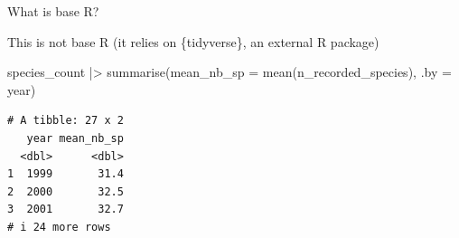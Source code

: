 \documentclass[
  ignorenonframetext,
  aspectratio=169,
]{beamer}
\newenvironment{Shaded}{\begin{snugshade}}{\end{snugshade}}
\newcommand{\AttributeTok}[1]{\textcolor[rgb]{0.40,0.45,0.13}{#1}}
\newcommand{\FunctionTok}[1]{\textcolor[rgb]{0.28,0.35,0.67}{#1}}
\newcommand{\NormalTok}[1]{\textcolor[rgb]{0.00,0.23,0.31}{#1}}
\newcommand{\SpecialCharTok}[1]{\textcolor[rgb]{0.37,0.37,0.37}{#1}}
\begin{document}
\begin{frame}[fragile]{What is base R?}
\protect{}\label{what-is-base-r}
\begin{block}{This is not base R (it relies on \{tidyverse\}, an
external R package)}
\protect{}\label{this-is-not-base-r-it-relies-on-tidyverse-an-external-r-package}
\footnotesize

\begin{Shaded}
\begin{Highlighting}[]
\NormalTok{species\_count }\SpecialCharTok{|\textgreater{}} 
    \FunctionTok{summarise}\NormalTok{(}\AttributeTok{mean\_nb\_sp =} \FunctionTok{mean}\NormalTok{(n\_recorded\_species), }\AttributeTok{.by =}\NormalTok{ year)}
\end{Highlighting}
\end{Shaded}

\begin{verbatim}
# A tibble: 27 x 2
   year mean_nb_sp
  <dbl>      <dbl>
1  1999       31.4
2  2000       32.5
3  2001       32.7
# i 24 more rows
\end{verbatim}

\normalsize
\end{block}
\end{frame}
\end{document}
